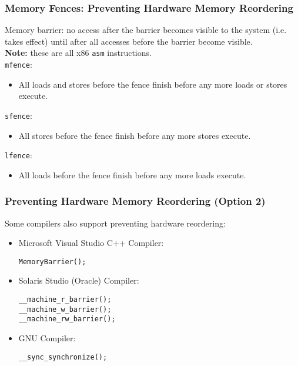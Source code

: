 \documentclass[aspectratio=43]{beamer}
\newenvironment{changemargin}[1]{%
  \begin{list}{}{%
    \setlength{\topsep}{0pt}%
    \setlength{\leftmargin}{#1}%
    \setlength{\rightmargin}{1em}
    \setlength{\listparindent}{\parindent}%
    \setlength{\itemindent}{\parindent}%
    \setlength{\parsep}{\parskip}%
  }%
  \item[]}{\end{list}}
\begin{document}
\begin{frame}
  \frametitle{Memory Fences: Preventing Hardware Memory Reordering}

  \begin{changemargin}{0.5cm}

Memory barrier: no access after the barrier becomes visible to the
system (i.e. takes effect) until after all accesses before the barrier
become visible.\\[1em]

  {\bf Note:} these are all x86 {\tt asm} instructions.\\[1em]
  {\tt mfence}:
  \begin{itemize}
    \item All loads and stores before the fence finish before any more loads or stores execute.
  \end{itemize}
  {\tt sfence}:
  \begin{itemize}
    \item All stores before the fence finish before any more stores execute.
  \end{itemize}
  {\tt lfence}:
  \begin{itemize}
    \item All loads before the fence finish before any more loads execute.
  \end{itemize}
  \end{changemargin}
\end{frame}

\begin{frame}[fragile]
  \frametitle{Preventing Hardware Memory Reordering (Option 2)}

  \begin{changemargin}{1.5cm}
  Some compilers also support preventing hardware reordering:

\begin{itemize}
  \item Microsoft Visual Studio C++ Compiler:
  \begin{lstlisting}
MemoryBarrier();
  \end{lstlisting}

  \item Solaris Studio (Oracle) Compiler:
  \begin{lstlisting}
__machine_r_barrier();
__machine_w_barrier();
__machine_rw_barrier();
  \end{lstlisting}

  \item GNU Compiler:
  \begin{lstlisting}
__sync_synchronize();
  \end{lstlisting}
\end{itemize}
  \end{changemargin}
\end{frame}
\end{document}

